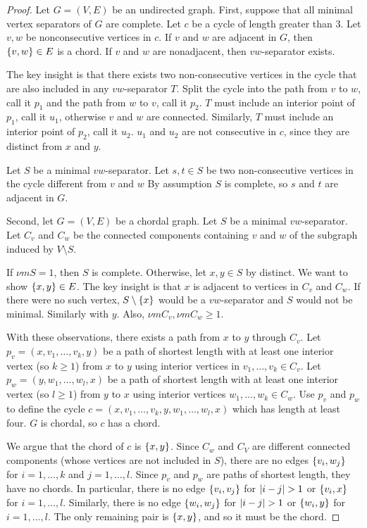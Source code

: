 \begin{proof}Let $G = (V, E)$ be an undirected graph.
First, suppose that all minimal vertex separators of $G$ are complete.
Let $c$ be a cycle of length greater than 3.
Let $v, w$ be nonconsecutive vertices in $c$.
If $v$ and $w$ are adjacent in $G$, then $\{v, w\} \in E$ is a chord.
If $v$ and $w$ are nonadjacent, then $vw$-separator exists.

The key insight is that there exists two non-consecutive vertices in the cycle that are also included in any $vw$-separator $T$.
Split the cycle into the path from $v$ to $w$, call it $p_1$ and the path from $w$ to $v$, call it $p_2$.
$T$ must include an interior point of $p_1$, call it $u_1$, otherwise $v$ and $w$ are connected.
Similarly, $T$ must include an interior point of $p_2$, call it $u_2$.
$u_1$ and $u_2$ are not consecutive in $c$, since they are distinct from $x$ and $y$.

Let $S$ be a minimal $vw$-separator.
Let $s, t \in S$ be two non-consecutive vertices in the cycle different from $v$ and $w$
By assumption $S$ is complete, so $s$ and $t$ are adjacent in $G$.

Second, let $G = (V, E)$ be a chordal graph.
Let $S$ be a minimal $vw$-separator.
Let $C_v$ and $C_w$ be the connected components containing $v$ and $w$ of the subgraph induced by $V \setminus S$.

If $\nu m{S} = 1$, then $S$ is complete.
Otherwise, let $x, y \in S$ by distinct.
We want to show $\{x, y\} \in E$.
The key insight is that $x$ is adjacent to vertices in $C_v$ and $C_w$.
If there were no such vertex, $S \setminus \{x\}$ would be a $vw$-separator and $S$ would not be minimal.
Similarly with $y$.
Also, $\nu m{C_v}, \nu m{C_w} \geq 1$.

With these observations, there exists a path from $x$ to $y$ through $C_v$.
Let $p_v = (x, v_1, \dots , v_k, y)$ be a path of shortest length with at least one interior vertex (so $k \geq 1$) from $x$ to $y$ using interior vertices in $v_1, \dots , v_k \in C_v$.
Let $p_w = (y, w_1, \dots , w_l, x)$ be a path of shortest length with at least one interior vertex (so $l \geq 1$) from $y$ to $x$ using interior vertices $w_1, \dots , w_k \in C_w$.
Use $p_v$ and $p_w$ to define the cycle $c = (x, v_1, \dots , v_k, y, w_1, \dots , w_l, x)$ which has length at least four.
$G$ is chordal, so $c$ has a chord.

We argue that the chord of $c$ is $\{x, y\}$.
Since $C_w$ and $C_V$ are different connected components (whose vertices are not included in $S$), there are no edges $\{v_i, w_j\}$ for $i = 1, \dots , k$ and $j = 1, \dots , l$.
Since $p_v$ and $p_w$ are paths of shortest length, they have no chords.
In particular, there is no edge $\{v_i, v_j\}$ for $\left|i - j\right| > 1$ or $\{v_i, x\}$ for $i = 1, \dots , l$.
Similarly, there is no edge $\{w_i, w_j\}$ for $\left|i - j\right| > 1$ or $\{w_i, y\}$ for $i = 1, \dots , l$.
The only remaining pair is $\{x, y\}$, and so it must be the chord.
\end{proof}
